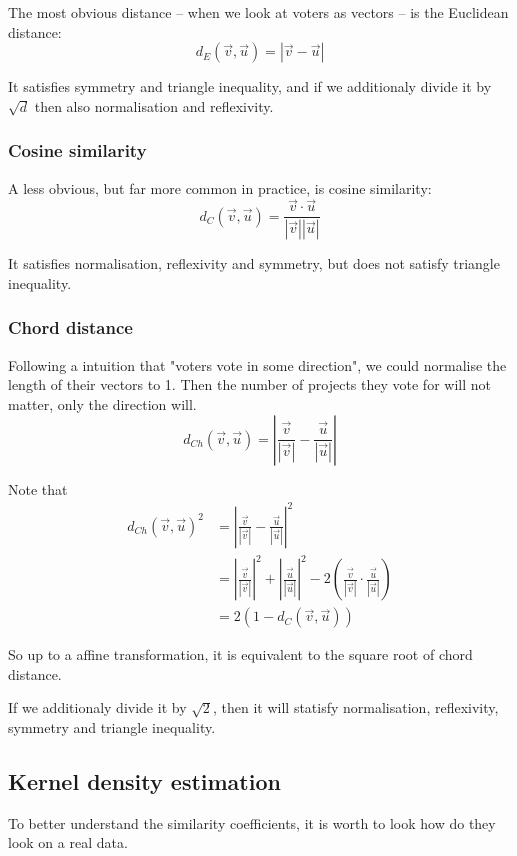 \documentclass{article}
\begin{document}
The most obvious distance -- when we look at voters as vectors -- is the
Euclidean distance:
\[ d_E(\vec v, \vec u) = | \vec v - \vec u | \]

It satisfies symmetry and triangle inequality, and if we additionaly divide it
by $\sqrt d$ then also normalisation and reflexivity.

\subsubsection{Cosine similarity}

A less obvious, but far more common in practice, is cosine similarity:
\[ d_C(\vec v, \vec u) = \frac{\vec v \cdot \vec u}{|\vec v||\vec u|} \]

It satisfies normalisation, reflexivity and symmetry, but does not satisfy
triangle inequality.

\subsubsection{Chord distance}

Following a intuition that "voters vote in some direction", we could normalise
the length of their vectors to 1. Then the number of projects they vote for
will not matter, only the direction will.
\[
  d_{Ch}(\vec v, \vec u) =
  \left|\frac{\vec v}{|\vec v|} - \frac{\vec u}{|\vec u|}\right|
\]

Note that
\begin{align*}
  d_{Ch}(\vec v, \vec u)^2
  &= \left|\frac{\vec v}{|\vec v|} - \frac{\vec u}{|\vec u|}\right|^2 \\
  &= \left|\frac{\vec v}{|\vec v|}\right|^2
   + \left|\frac{\vec u}{|\vec u|}\right|^2
   - 2 \left( \frac{\vec v}{|\vec v|} \cdot \frac{\vec u}{|\vec u|} \right) \\
  &= 2(1 - d_C(\vec v, \vec u))
\end{align*}

So up to a affine transformation, it is equivalent to the square root of chord
distance.

If we additionaly divide it by $\sqrt 2$, then it will statisfy normalisation,
reflexivity, symmetry and triangle inequality.

\subsection{Kernel density estimation}

To better understand the similarity coefficients, it is worth to look how do
they look on a real data.
\end{document}
